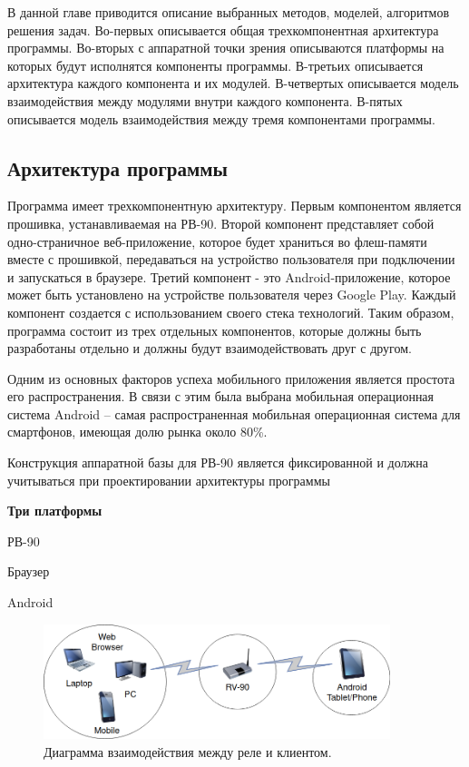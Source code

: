 В данной главе приводится описание выбранных методов, моделей, алгоритмов решения задач.
Во-первых описывается общая трехкомпонентная архитектура программы.
Во-вторых с аппаратной точки зрения описываются платформы на которых будут исполнятся компоненты программы.
В-третьих описывается архитектура каждого компонента и их модулей.
В-четвертых описывается модель взаимодействия между модулями внутри каждого компонента.
В-пятых описывается модель взаимодействия между тремя компонентами программы.

\subsection{ Архитектура программы }
Программа имеет трехкомпонентную архитектуру. Первым компонентом является прошивка, устанавливаемая на РВ-90. Второй компонент представляет собой одно-страничное веб-приложение, которое будет храниться во флеш-памяти вместе с прошивкой, передаваться на устройство пользователя при подключении и запускаться в браузере. Третий компонент - это Android-приложение, которое может быть установлено на устройстве пользователя через Google Play. Каждый компонент создается с использованием своего стека технологий. Таким образом, программа состоит из трех отдельных компонентов, которые должны быть разработаны отдельно и должны будут взаимодействовать друг с другом. 

Одним из основных факторов успеха мобильного приложения является простота его  распространения.  В связи с этим была выбрана мобильная операционная система  Android – самая распространенная мобильная операционная система для смартфонов, имеющая долю рынка около 80\%.
 
Конструкция аппаратной базы для РВ-90 является фиксированной и должна учитываться при проектировании архитектуры программы

\textbf{Три платформы}
\begin{my_itemize}
\item РВ-90
\item Браузер
\item Android
\end{my_itemize}


\begin{figure}[h!]
    \centering
    \includegraphics[width=0.9\textwidth]{three_platforms.png}
    \caption{Диаграмма взаимодействия между реле и клиентом.}
\end{figure}



